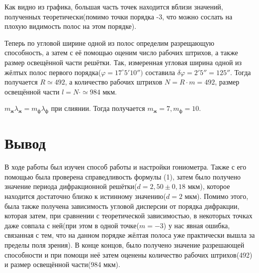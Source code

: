 \documentclass[a4paper,12pt]{article} %
\begin{document}
Как видно из графика, большая часть точек находится вблизи значений, полученных теоретически(помимо точки порядка -3, что можно сослать на плохую видимость полос на этом порядке).

Теперь по угловой ширине одной из полос определим разрещающую способность, а затем с её помощью оценим число рабочих штрихов, а также размер освещённой части решётки. Так, измеренная угловая ширина одной из жёлтых полос первого порядка($\varphi = 17^\circ 5' 10'')$ составила $\delta \varphi = 2' 5'' = 125''$. Тогда получается $R \simeq 492$, а количество рабочих штрихов $N = R\cdot m = 492$, размер освещённой части $l = N \cdot \simeq 984$ мкм.


$m_\text{ж} \lambda_\text{ж} = m_\text{ф} \lambda_\text{ф}$ при слиянии. Тогда получается $m_\text{ж} = 7, m_\text{ф} = 10$.

\section{Вывод}
В ходе работы был изучен способ работы и настройки гониометра. Также с его помощью была проверена справедливость формулы (1), затем было получено значение периода дифракционной решётки($d = 2,50 \pm 0,18$ мкм), которое находится достаточно близко к истинному значению($d = 2$ мкм). Помимо этого, была также получена зависимость угловой дисперсии от порядка дифракции, которая затем, при сравнении с теоретической зависимостью, в некоторых точках даже совпала с ней(при этом в одной точке($m=-3$) у нас явная ошибка, связанная с тем, что на данном порядке жёлтая полоса уже практически вышла за пределы поля зрения). В конце концов, было получено значение разрешающей способности и при помощи неё затем оценены количество рабочих штрихов(492) и размер освещённой части(984 мкм).
\end{document}
